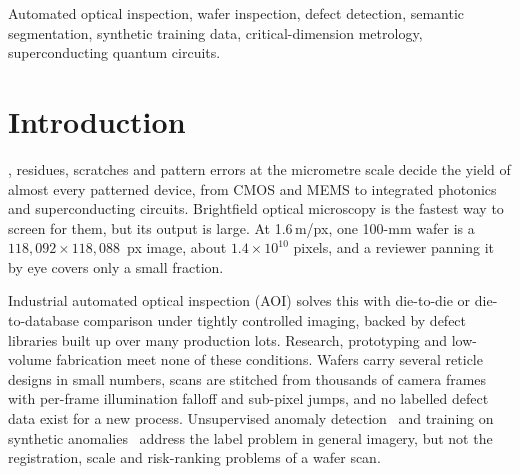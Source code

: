 \documentclass[journal]{IEEEtran}
\newcommand{\umpx}{\,\textmu m/px}
\begin{document}
\begin{IEEEkeywords}
Automated optical inspection, wafer inspection, defect detection, semantic segmentation, synthetic training data, critical-dimension metrology, superconducting quantum circuits.
\end{IEEEkeywords}

\section{Introduction}
, residues, scratches and pattern errors at the micrometre scale decide the yield of almost every patterned device, from CMOS and MEMS to integrated photonics and superconducting circuits. Brightfield optical microscopy is the fastest way to screen for them, but its output is large. At 1.6\umpx, one 100-mm wafer is a $118{,}092 \times 118{,}088$~px image, about $1.4 \times 10^{10}$ pixels, and a reviewer panning it by eye covers only a small fraction.

Industrial automated optical inspection (AOI) solves this with die-to-die or die-to-database comparison under tightly controlled imaging, backed by defect libraries built up over many production lots. Research, prototyping and low-volume fabrication meet none of these conditions. Wafers carry several reticle designs in small numbers, scans are stitched from thousands of camera frames with per-frame illumination falloff and sub-pixel jumps, and no labelled defect data exist for a new process. Unsupervised anomaly detection~\cite{bergmann2019mvtec} and training on synthetic anomalies~\cite{li2021cutpaste,zavrtanik2021draem} address the label problem in general imagery, but not the registration, scale and risk-ranking problems of a wafer scan.
\end{document}
